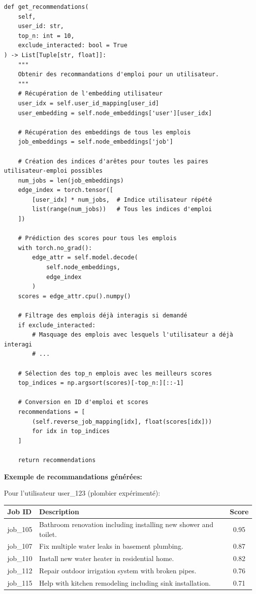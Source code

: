 \documentclass[12pt,a4paper]{article}
\begin{document}
\begin{lstlisting}[caption=Génération de recommandations]
def get_recommendations(
    self,
    user_id: str,
    top_n: int = 10,
    exclude_interacted: bool = True
) -> List[Tuple[str, float]]:
    """
    Obtenir des recommandations d'emploi pour un utilisateur.
    """
    # Récupération de l'embedding utilisateur
    user_idx = self.user_id_mapping[user_id]
    user_embedding = self.node_embeddings['user'][user_idx]
    
    # Récupération des embeddings de tous les emplois
    job_embeddings = self.node_embeddings['job']
    
    # Création des indices d'arêtes pour toutes les paires utilisateur-emploi possibles
    num_jobs = len(job_embeddings)
    edge_index = torch.tensor([
        [user_idx] * num_jobs,  # Indice utilisateur répété
        list(range(num_jobs))   # Tous les indices d'emploi
    ])
    
    # Prédiction des scores pour tous les emplois
    with torch.no_grad():
        edge_attr = self.model.decode(
            self.node_embeddings,
            edge_index
        )
    scores = edge_attr.cpu().numpy()
    
    # Filtrage des emplois déjà interagis si demandé
    if exclude_interacted:
        # Masquage des emplois avec lesquels l'utilisateur a déjà interagi
        # ...
    
    # Sélection des top_n emplois avec les meilleurs scores
    top_indices = np.argsort(scores)[-top_n:][::-1]
    
    # Conversion en ID d'emploi et scores
    recommendations = [
        (self.reverse_job_mapping[idx], float(scores[idx]))
        for idx in top_indices
    ]
    
    return recommendations
\end{lstlisting}

\begin{examplebox}
\textbf{Exemple de recommandations générées:}

Pour l'utilisateur user\_123 (plombier expérimenté):

\begin{tabular}{|l|p{7cm}|c|}
\hline
\textbf{Job ID} & \textbf{Description} & \textbf{Score} \\
\hline
job\_105 & Bathroom renovation including installing new shower and toilet. & 0.95 \\
\hline
job\_107 & Fix multiple water leaks in basement plumbing. & 0.87 \\
\hline
job\_110 & Install new water heater in residential home. & 0.82 \\
\hline
job\_112 & Repair outdoor irrigation system with broken pipes. & 0.76 \\
\hline
job\_115 & Help with kitchen remodeling including sink installation. & 0.71 \\
\hline
\end{tabular}
\end{examplebox}
\end{document}
